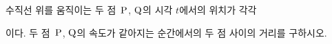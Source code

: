 수직선 위를 움직이는 두 점~$\mathrm{P}$, $\mathrm{Q}$의 시각 $t$에서의 위치가 각각\par\smallskip{}\par\smallskip\noindent 이다. 두 점~$\mathrm{P}$, $\mathrm{Q}$의 속도가 같아지는 순간에서의 두 점 사이의 거리를 구하시오.
